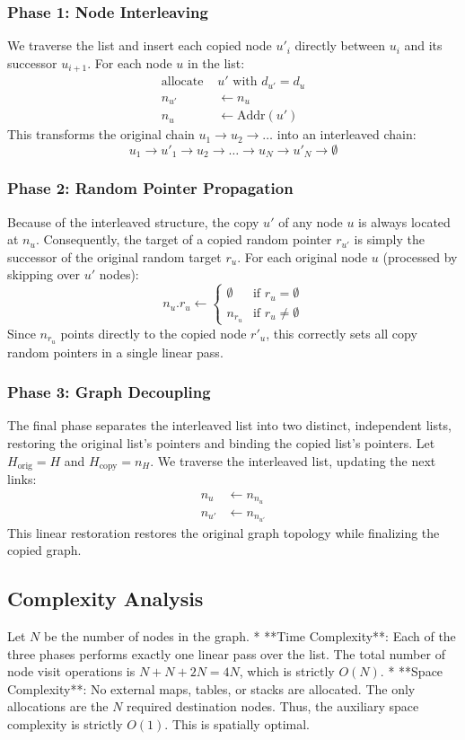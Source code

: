 \documentclass[10pt,journal,compsoc]{IEEEtran}
\begin{document}
\subsubsection{Phase 1: Node Interleaving}
We traverse the list and insert each copied node $u'_i$ directly between $u_i$ and its successor $u_{i+1}$.
For each node $u$ in the list:
\begin{align*}
\text{allocate } & u' \text{ with } d_{u'} = d_u \\
n_{u'} & \leftarrow n_u \\
n_u & \leftarrow \text{Addr}(u')
\end{align*}
This transforms the original chain $u_1 \to u_2 \to \dots$ into an interleaved chain:
\[ u_1 \to u'_1 \to u_2 \to \dots \to u_N \to u'_N \to \emptyset \]

\subsubsection{Phase 2: Random Pointer Propagation}
Because of the interleaved structure, the copy $u'$ of any node $u$ is always located at $n_u$. Consequently, the target of a copied random pointer $r_{u'}$ is simply the successor of the original random target $r_u$.
For each original node $u$ (processed by skipping over $u'$ nodes):
\[ n_u.r_u \leftarrow \begin{cases}
\emptyset & \text{if } r_u = \emptyset \\
n_{r_u} & \text{if } r_u \neq \emptyset
\end{cases} \]
Since $n_{r_u}$ points directly to the copied node $r'_u$, this correctly sets all copy random pointers in a single linear pass.

\subsubsection{Phase 3: Graph Decoupling}
The final phase separates the interleaved list into two distinct, independent lists, restoring the original list's pointers and binding the copied list's pointers.
Let $H_{\text{orig}} = H$ and $H_{\text{copy}} = n_H$.
We traverse the interleaved list, updating the next links:
\begin{align*}
n_u & \leftarrow n_{n_u} \\
n_{u'} & \leftarrow n_{n_{u'}}
\end{align*}
This linear restoration restores the original graph topology while finalizing the copied graph.

\subsection{Complexity Analysis}
Let $N$ be the number of nodes in the graph.
* **Time Complexity**: Each of the three phases performs exactly one linear pass over the list. The total number of node visit operations is $N + N + 2N = 4N$, which is strictly $O(N)$.
* **Space Complexity**: No external maps, tables, or stacks are allocated. The only allocations are the $N$ required destination nodes. Thus, the auxiliary space complexity is strictly $O(1)$. This is spatially optimal.
\end{document}
